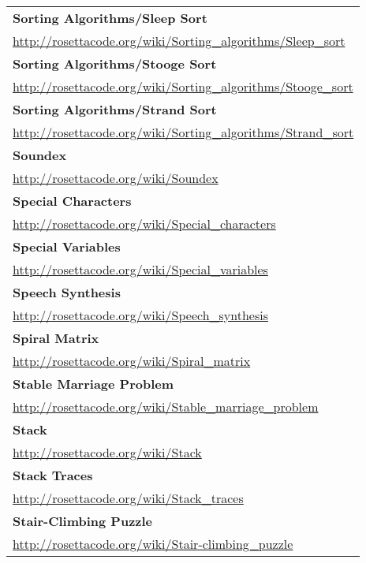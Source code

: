 \begin{longtable}{l}
\textbf{Sorting Algorithms/Sleep Sort } \\ \href{http://rosettacode.org/wiki/Sorting\_algorithms/Sleep\_sort}{http://rosettacode.org/wiki/Sorting\_algorithms/Sleep\_sort} \\
\textbf{
Sorting Algorithms/Stooge Sort } \\ \href{http://rosettacode.org/wiki/Sorting\_algorithms/Stooge\_sort}{http://rosettacode.org/wiki/Sorting\_algorithms/Stooge\_sort} \\
\textbf{Sorting Algorithms/Strand Sort } \\ \href{http://rosettacode.org/wiki/Sorting\_algorithms/Strand\_sort}{http://rosettacode.org/wiki/Sorting\_algorithms/Strand\_sort} \\
\textbf{
Soundex } \\ \href{http://rosettacode.org/wiki/Soundex}{http://rosettacode.org/wiki/Soundex} \\
\textbf{Special Characters } \\ \href{http://rosettacode.org/wiki/Special\_characters}{http://rosettacode.org/wiki/Special\_characters} \\
\textbf{Special Variables } \\ \href{http://rosettacode.org/wiki/Special\_variables}{http://rosettacode.org/wiki/Special\_variables} \\
\textbf{Speech Synthesis } \\ \href{http://rosettacode.org/wiki/Speech\_synthesis}{http://rosettacode.org/wiki/Speech\_synthesis} \\
\textbf{
Spiral Matrix } \\ \href{http://rosettacode.org/wiki/Spiral\_matrix}{http://rosettacode.org/wiki/Spiral\_matrix} \\
\textbf{Stable Marriage Problem } \\ \href{http://rosettacode.org/wiki/Stable\_marriage\_problem}{http://rosettacode.org/wiki/Stable\_marriage\_problem} \\
\textbf{Stack } \\ \href{http://rosettacode.org/wiki/Stack}{http://rosettacode.org/wiki/Stack} \\
\textbf{Stack Traces } \\ \href{http://rosettacode.org/wiki/Stack\_traces}{http://rosettacode.org/wiki/Stack\_traces} \\
\textbf{
Stair-Climbing Puzzle } \\ \href{http://rosettacode.org/wiki/Stair-climbing\_puzzle}{http://rosettacode.org/wiki/Stair-climbing\_puzzle} \\

\end{longtable}
